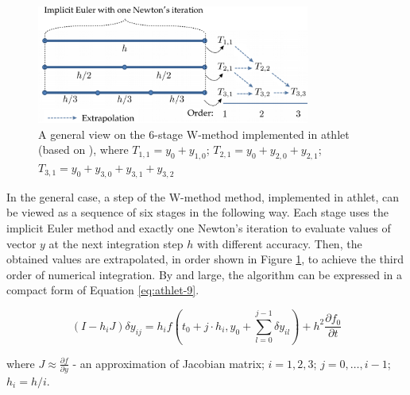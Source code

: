 \figpointer{\ref{fig:introduction-w-method-scheme}}
\begin{figure}[htpb]
  \centering
  \includegraphics[width=0.8\textwidth]{figures/introduction-rosenbrock-scheme.png}
\caption[A general view on the 6-stage W-method implemented in \acrshort{athlet}]{A general view on the 6-stage W-method implemented in \acrshort{athlet} (based on \cite{tims-presentation}), where $T_{1,1} = y_{0} + y_{1,0}$; $T_{2,1} = y_{0} + y_{2,0} + y_{2,1}$; $T_{3,1} = y_{0} + y_{3,0} + y_{3,1} + y_{3,2}$ 
}

\label{fig:introduction-w-method-scheme}
\end{figure}

In the general case, a step of the W-method method, implemented in \acrshort{athlet}, can be viewed as a sequence of six stages in the following way. Each stage uses the implicit Euler method and exactly one Newton's iteration to evaluate values of vector $y$ at the next integration step $h$ with different accuracy. Then, the obtained values are extrapolated, in order shown in Figure \ref{fig:introduction-w-method-scheme}, to achieve the third order of numerical integration. By and large, the algorithm can be expressed in a compact form of Equation \ref{eq:athlet-9}.


 \begin{equation} \label{eq:athlet-9}
        (I - h_{i}J)\delta y_{ij} = h_{i} f(t_{0} + j \cdot h_{i}, y_{0} + \sum^{j-1}_{l = 0} \delta y_{il}) + h^{2} \frac{\partial f_{0}}{\partial t}
    \end{equation}

where $J \approx \frac{\partial f}{\partial y}$ - an approximation of Jacobian matrix; $i = 1, 2, 3$; $j=0, \dots, i - 1$; $h_{i} = h / i$.



